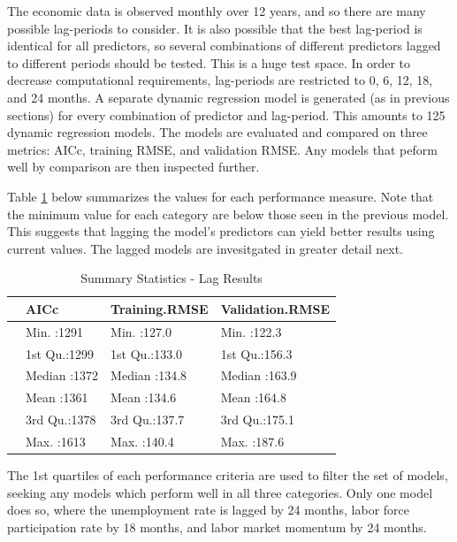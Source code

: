 \documentclass[12pt,letterpaper,toc=flat,oneside]{report}
\theoremstyle{definition}
\theoremstyle{definition}
\theoremstyle{definition}
\theoremstyle{remark}
\begin{document}
The economic data is observed monthly over 12 years, and so there are
many possible lag-periods to consider. It is also possible that the best
lag-period is identical for all predictors, so several combinations of
different predictors lagged to different periods should be tested. This
is a huge test space. In order to decrease computational requirements,
lag-periods are restricted to 0, 6, 12, 18, and 24 months. A separate
dynamic regression model is generated (as in previous sections) for
every combination of predictor and lag-period. This amounts to 125
dynamic regression models. The models are evaluated and compared on
three metrics: AICc, training RMSE, and validation RMSE. Any models that
peform well by comparison are then inspected further.

Table \ref{tab:lag-results-1} below summarizes the values for each
performance measure. Note that the minimum value for each category are
below those seen in the previous model. This suggests that lagging the
model's predictors can yield better results using current values. The
lagged models are invesitgated in greater detail next.

\begin{table}[!h]

\caption{\label{tab:lag-results-1}Summary Statistics - Lag Results}
\centering
\begin{tabular}[t]{llll}
\toprule
\bfseries{ } & \bfseries{     AICc} & \bfseries{Training.RMSE} & \bfseries{Validation.RMSE}\\
\midrule
 & Min.   :1291 & Min.   :127.0 & Min.   :122.3\\
 & 1st Qu.:1299 & 1st Qu.:133.0 & 1st Qu.:156.3\\
 & Median :1372 & Median :134.8 & Median :163.9\\
 & Mean   :1361 & Mean   :134.6 & Mean   :164.8\\
 & 3rd Qu.:1378 & 3rd Qu.:137.7 & 3rd Qu.:175.1\\
 & Max.   :1613 & Max.   :140.4 & Max.   :187.6\\
\bottomrule
\end{tabular}
\end{table}

The 1st quartiles of each performance criteria are used to filter the
set of models, seeking any models which perform well in all three
categories. Only one model does so, where the unemployment rate is
lagged by 24 months, labor force participation rate by 18 months, and
labor market momentum by 24 months.
\end{document}
